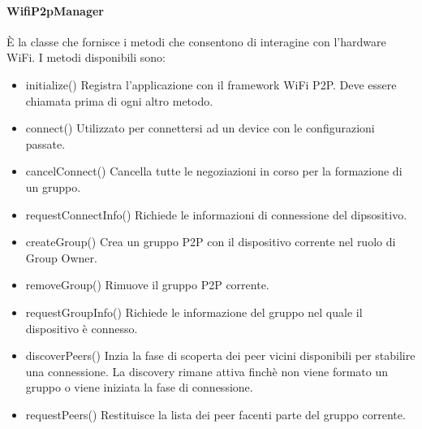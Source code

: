 \documentclass{llncs}
\begin{document}
\paragraph{WifiP2pManager}
È la classe che fornisce i metodi che consentono di interagine con l'hardware WiFi. I metodi disponibili sono:
\begin{itemize}
	\item{initialize()} Registra l'applicazione con il framework WiFi P2P. Deve essere chiamata prima di ogni altro metodo.
	\item{connect()} Utilizzato per connettersi ad un device con le configurazioni passate.
	\item{cancelConnect()} Cancella tutte le negoziazioni in corso per la formazione di un gruppo.
	\item{requestConnectInfo()} Richiede le informazioni di connessione del dipsositivo.
	\item{createGroup()} Crea un gruppo P2P con il dispositivo corrente nel ruolo di Group Owner.
	\item{removeGroup()} Rimuove il gruppo P2P corrente.
	\item{requestGroupInfo()} Richiede le informazione del gruppo nel quale il dispositivo è connesso.
	\item{discoverPeers()} Inzia la fase di scoperta dei peer vicini disponibili per stabilire una connessione. La discovery rimane attiva finchè non viene formato un gruppo o viene iniziata la fase di connessione.
	\item{requestPeers()} Restituisce la lista dei peer facenti parte del gruppo corrente.
\end{itemize}
\end{document}
